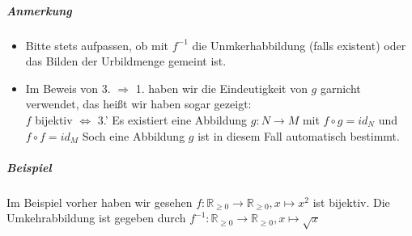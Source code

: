 \documentclass[a4paper]{scrartcl}
\begin{document}
\subparagraph{Anmerkung}
\label{sec-2-6-7-6-2}
\begin{itemize}
\item Bitte stets aufpassen, ob mit $f^{-1}$ die Unmkerhabbildung (falls existent) oder das Bilden der Urbildmenge gemeint ist.
\item Im Beweis von 3. $\Rightarrow$ 1. haben wir die Eindeutigkeit von $g$ garnicht verwendet, das heißt wir haben sogar gezeigt: \\
        $f$ bijektiv $\Leftrightarrow$ 3.' Es existiert eine Abbildung $g:N\to M$ mit $f\circ g = id_N$ und $f\circ f = id_M$ Soch eine Abbildung $g$ ist in diesem Fall automatisch bestimmt.
\end{itemize}
\subparagraph{Beispiel}
\label{sec-2-6-7-6-3}
Im Beispiel vorher haben wir gesehen $f:\mathbb{R}_{\geq 0} \to \mathbb{R}_{\geq 0}, x\mapsto x^2$ ist bijektiv.
Die Umkehrabbildung ist gegeben durch $f^{-1}:\mathbb{R}_{\geq 0} \to \mathbb{R}_{\geq 0}, x\mapsto \sqrt{x}$
\end{document}
